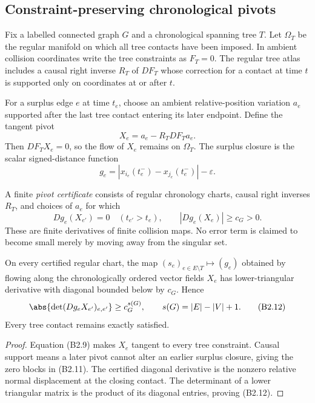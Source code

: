 \subsection{Constraint-preserving chronological pivots}

Fix a labelled connected graph $G$ and a chronological spanning tree $T$.
Let $\Omega_T$ be the regular manifold on which all tree contacts have been
imposed.  In ambient collision coordinates write the tree constraints as
$F_T=0$.  The regular tree atlas includes a causal right inverse
$R_T$ of $DF_T$ whose correction for a contact at time $t$ is supported only
on coordinates at or after $t$.

For a surplus edge $e$ at time $t_e$, choose an ambient relative-position
variation $a_e$ supported after the last tree contact entering its later
endpoint.  Define the tangent pivot
\[
 X_e=a_e-R_TDF_Ta_e.                                      \tag{B2.9}
\]
Then $DF_TX_e=0$, so the flow of $X_e$ remains on $\Omega_T$.  The surplus
closure is the scalar signed-distance function
\[
 g_e=|x_{i_e}(t_e^-)-x_{j_e}(t_e^-)|-\varepsilon.          \tag{B2.10}
\]

A finite \emph{pivot certificate} consists of regular chronology charts,
causal right inverses $R_T$, and choices of $a_e$ for which
\[
 Dg_e(X_{e'})=0\quad(t_{e'}>t_e),\qquad
 |Dg_e(X_e)|\ge c_G>0.                                    \tag{B2.11}
\]
These are finite derivatives of finite collision maps.  No error term is
claimed to become small merely by moving away from the singular set.

\begin{lemma}
\label{lem:r29-b2-pivots}
On every certified regular chart, the map
$(s_e)_{e\in E\setminus T}\mapsto(g_e)$ obtained by flowing along the
chronologically ordered vector fields $X_e$ has lower-triangular derivative
with diagonal bounded below by $c_G$.  Hence
\[
 \abs{\det(Dg_eX_{e'})_{e,e'}}\ge c_G^{s(G)},
 \qquad s(G)=|E|-|V|+1.                                  \tag{B2.12}
\]
Every tree contact remains exactly satisfied.
\end{lemma}

\begin{proof}
Equation (B2.9) makes $X_e$ tangent to every tree constraint.  Causal support
means a later pivot cannot alter an earlier surplus closure, giving the zero
blocks in (B2.11).  The certified diagonal derivative is the nonzero relative
normal displacement at the closing contact.  The determinant of a lower
triangular matrix is the product of its diagonal entries, proving (B2.12).
\end{proof}

